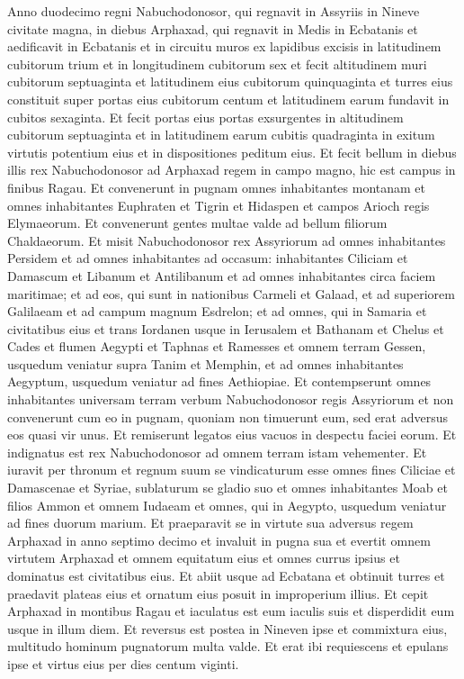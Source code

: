 \begin{biblechapter}
 \verse Anno duodecimo regni Nabuchodonosor, qui regnavit in Assyriis in Nineve civitate magna, in diebus Arphaxad, qui regnavit in Medis in Ecbatanis 
\verse et aedificavit in Ecbatanis et in circuitu muros ex lapidibus excisis in latitudinem cubitorum trium et in longitudinem cubitorum sex et fecit altitudinem muri cubitorum septuaginta et latitudinem eius cubitorum quinquaginta 
\verse et turres eius constituit super portas eius cubitorum centum et latitudinem earum fundavit in cubitos sexaginta. 
\verse Et fecit portas eius portas exsurgentes in altitudinem cubitorum septuaginta et in latitudinem earum cubitis quadraginta in exitum virtutis potentium eius et in dispositiones peditum eius. 
\verse Et fecit bellum in diebus illis rex Nabuchodonosor ad Arphaxad regem in campo magno, hic est campus in finibus Ragau. 
\verse Et convenerunt in pugnam omnes inhabitantes montanam et omnes inhabitantes Euphraten et Tigrin et Hidaspen et campos Arioch regis Elymaeorum. Et convenerunt gentes multae valde ad bellum filiorum Chaldaeorum. 
\verse Et misit Nabuchodonosor rex Assyriorum ad omnes inhabitantes Persidem et ad omnes inhabitantes ad occasum: inhabitantes Ciliciam et Damascum et Libanum et Antilibanum et ad omnes inhabitantes circa faciem maritimae; 
\verse et ad eos, qui sunt in nationibus Carmeli et Galaad, et ad superiorem Galilaeam et ad campum magnum Esdrelon; 
\verse et ad omnes, qui in Samaria et civitatibus eius et trans Iordanen usque in Ierusalem et Bathanam et Chelus et Cades et flumen Aegypti et Taphnas et Ramesses et omnem terram Gessen, 
 \verse usquedum veniatur supra Tanim et Memphin, et ad omnes inhabitantes Aegyptum, usquedum veniatur ad fines Aethiopiae. 
\verse Et contempserunt omnes inhabitantes universam terram verbum Nabuchodonosor regis Assyriorum et non convenerunt cum eo in pugnam, quoniam non timuerunt eum, sed erat adversus eos quasi vir unus. Et remiserunt legatos eius vacuos in despectu faciei eorum. 
 \verse Et indignatus est rex Nabuchodonosor ad omnem terram istam vehementer. Et iuravit per thronum et regnum suum se vindicaturum esse omnes fines Ciliciae et Damascenae et Syriae, sublaturum se gladio suo et omnes inhabitantes Moab et filios Ammon et omnem Iudaeam et omnes, qui in Aegypto, usquedum veniatur ad fines duorum marium. 
\verse Et praeparavit se in virtute sua adversus regem Arphaxad in anno septimo decimo et invaluit in pugna sua et evertit omnem virtutem Arphaxad et omnem equitatum eius et omnes currus ipsius 
\verse et dominatus est civitatibus eius. Et abiit usque ad Ecbatana et obtinuit turres et praedavit plateas eius et ornatum eius posuit in improperium illius. 
\verse Et cepit Arphaxad in montibus Ragau et iaculatus est eum iaculis suis et disperdidit eum usque in illum diem. 
\verse Et reversus est postea in Nineven ipse et commixtura eius, multitudo hominum pugnatorum multa valde. Et erat ibi requiescens et epulans ipse et virtus eius per dies centum viginti.
 

\end{biblechapter}
